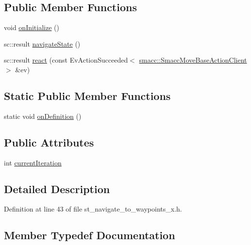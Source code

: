 \subsection*{Public Member Functions}
\begin{DoxyCompactItemize}
\item 
void \hyperlink{structStNavigateToWaypointsX_ac5f251c0431495e14c458a298592b663}{on\+Initialize} ()
\item 
sc\+::result \hyperlink{structStNavigateToWaypointsX_a0df2892ed95cae253b2ae0c09c850268}{navigate\+State} ()
\item 
sc\+::result \hyperlink{structStNavigateToWaypointsX_a9d8d8e362b587429680ea2800a6c181c}{react} (const Ev\+Action\+Succeeded$<$ \hyperlink{classsmacc_1_1SmaccMoveBaseActionClient}{smacc\+::\+Smacc\+Move\+Base\+Action\+Client} $>$ \&ev)
\end{DoxyCompactItemize}
\subsection*{Static Public Member Functions}
\begin{DoxyCompactItemize}
\item 
static void \hyperlink{structStNavigateToWaypointsX_a0698c15b3241c4aa15a4f5380365e72d}{on\+Definition} ()
\end{DoxyCompactItemize}
\subsection*{Public Attributes}
\begin{DoxyCompactItemize}
\item 
int \hyperlink{structStNavigateToWaypointsX_a2f597fd0ee0258ef66506e98d55e8060}{current\+Iteration}
\end{DoxyCompactItemize}


\subsection{Detailed Description}


Definition at line 43 of file st\+\_\+navigate\+\_\+to\+\_\+waypoints\+\_\+x.\+h.



\subsection{Member Typedef Documentation}
